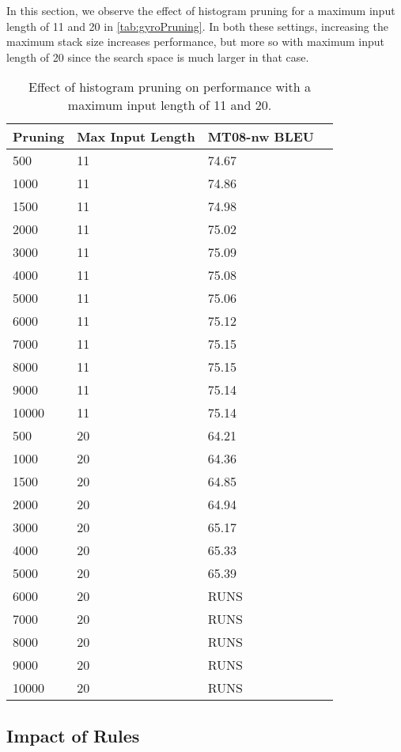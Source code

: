 In this section, we observe the effect of histogram pruning for
a maximum input length of 11 and 20 in \autoref{tab:gyroPruning}.
In both these settings,
increasing the maximum stack size increases performance, but
more so with maximum input length of 20 since the search space
is much larger in that case.
%
\begin{table}
  \begin{center}
  \begin{tabular}{l|l|l|l}
    Pruning & Max Input Length & MT08-nw BLEU \\
    \hline
    500  & 11 & 74.67 \\
    1000 & 11 & 74.86 \\
    1500 & 11 & 74.98 \\
    2000 & 11 & 75.02 \\
    3000 & 11 & 75.09 \\
    4000 & 11 & 75.08 \\
    5000 & 11 & 75.06 \\
    6000 & 11 & 75.12 \\
    7000 & 11 & 75.15 \\
    8000 & 11 & 75.15 \\
    9000 & 11 & 75.14 \\
    10000 & 11 & 75.14 \\
    \hline
    500  & 20 & 64.21 \\
    1000 & 20 & 64.36 \\
    1500 & 20 & 64.85 \\
    2000 & 20 & 64.94 \\
    3000 & 20 & 65.17 \\
    4000 & 20 & 65.33 \\
    5000 & 20 & 65.39 \\
    6000 & 20 & RUNS \\
    7000 & 20 & RUNS \\
    8000 & 20 & RUNS \\
    9000 & 20 & RUNS \\
    10000 & 20 & RUNS \\
  \end{tabular}
  \caption{Effect of histogram pruning on performance with a maximum input length
  of 11 and 20.}
  \label{tab:gyroPruning}
  \end{center}
\end{table}

\subsection{Impact of Rules}

